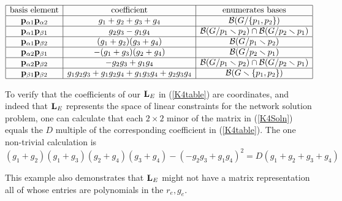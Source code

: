 \begin{equation}\label{K4table}
\begin{array}{|c|c|c|} \hline
\text{basis element} & \text{coefficient} & \text{enumerates bases}\\
  \hline

\mathbf{p}_{\alpha 1}\mathbf{p}_{\alpha 2} &
g_1 + g_2 + g_3 + g_4 & \mathcal{B}(G/\{p_1, p_2\})

\\ \hline

\mathbf{p}_{\alpha 1}\mathbf{p}_{\beta 1} &
g_2g_3 - g_1g_4 &  \mathcal{B}(G/p_1\smallsetminus p_2)\cap\mathcal{B}(G/p_2\smallsetminus p_1)

\\ \hline

\mathbf{p}_{\alpha 1}\mathbf{p}_{\beta 2} &
(g_1 + g_2)(g_3 + g_4) & \mathcal{B}(G/p_1\smallsetminus p_2)
\\ \hline 

\mathbf{p}_{\alpha 2}\mathbf{p}_{\beta 1} & -(g_1 + g_3)(g_2+g_4) & \mathcal{B}(G/p_2\smallsetminus p_1)
\\ \hline
 
\mathbf{p}_{\alpha 2}\mathbf{p}_{\beta 2} &
-g_2g_3 + g_1g_4 & \mathcal{B}(G/p_1\smallsetminus p_2)\cap\mathcal{B}(G/p_2\smallsetminus p_1)
\\ \hline
 
\mathbf{p}_{\beta 1}\mathbf{p}_{\beta 2} &
g_1g_2g_3 + g_1g_2g_4 + g_1g_3g_4 + g_2g_3g_4 & \mathcal{B}(G\smallsetminus \{p_1, p_2\})
\\ \hline

\end{array}
\end{equation}

To verify that the coefficients of our $\mathbf{L}_E$
in (\ref{K4table}) are \Plucker coordinates, and
indeed that $\mathbf{L}_E$ represents the space of
linear constraints for the
network solution problem,
one can calculate that each $2\times 2$ minor of the matrix in
(\ref{K4Soln}) equals the $D$ multiple of the corresponding coefficient
in  (\ref{K4table}).  The one non-trivial calculation is
\[
{\left(g_{1} + g_{2}\right)} {\left(g_{1} + g_{3}\right)} {\left(g_{2} + g_{4}\right)} {\left(g_{3} + g_{4}\right)} - {\left(-g_{2} g_{3} + g_{1} g_{4}\right)}^{2} = D(g_1+g_2+g_3+g_4)
\]

This example also demonstrates that $\mathbf{L}_E$ might not have a
matrix representation all of whose entries are polynomials in the $r_e, g_e$.

